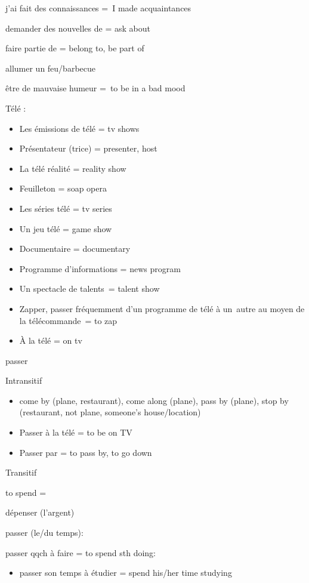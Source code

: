 {j'ai fait des connaissances =~}{I made acquaintances}

{demander des nouvelles de = ask about}

{faire partie de = belong to, be part of}

{allumer un feu/barbecue}

{être de mauvaise humeur =~}{to be in a bad mood}

{Télé :}

\begin{itemize}
\item
  {Les émissions de télé = tv shows~}
\item
  {Présentateur (trice) = presenter, host}
\item
  {La télé réalité = reality show~}
\item
  {Feuilleton = soap opera~}
\item
  {Les séries télé = tv series~}
\item
  {Un jeu télé = game show~}
\item
  Documentaire = documentary~
\item
  Programme d'informations = news program
\item
  Un spectacle de talents~= talent show~
\item
  Zapper, passer fréquemment d'un programme de télé à un~autre au moyen
  de la télécommande~= to zap
\item
  À la télé = on tv
\end{itemize}

{passer}

{Intransitif~}

\begin{itemize}
\item
  {come by (plane, restaurant), come along (plane), pass by (plane),
  stop by (}{restaurant, not plane, someone's house/location}{)}
\item
  {Passer à la télé = to be on TV}
\item
  {Passer par = to pass by, to go down}
\end{itemize}

{Transitif~}

to spend =

dépenser (l'argent)

passer (le/du temps):

{passer} qqch {à} faire = to spend sth doing:

\begin{itemize}
\item
  passer son temps à étudier = spend his/her time studying
\end{itemize}

